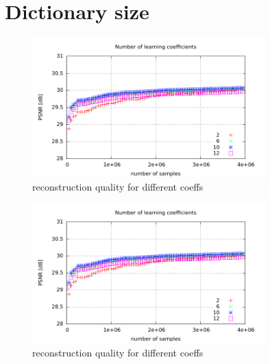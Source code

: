 \newpage
\section{Dictionary size}

\begin{figure}[h]
\centering
\includegraphics[width = 0.8\textwidth]{../tests/results/coeffsConverg.pdf}
\caption{reconstruction quality for different coeffs}
\label{fig:dict size}
\end{figure}

\begin{figure}[h]
\centering
\includegraphics[width = 0.8\textwidth]{../tests/results/coeffsConverg.pdf}
\caption{reconstruction quality for different coeffs}
\label{fig:dict size}
\end{figure}


